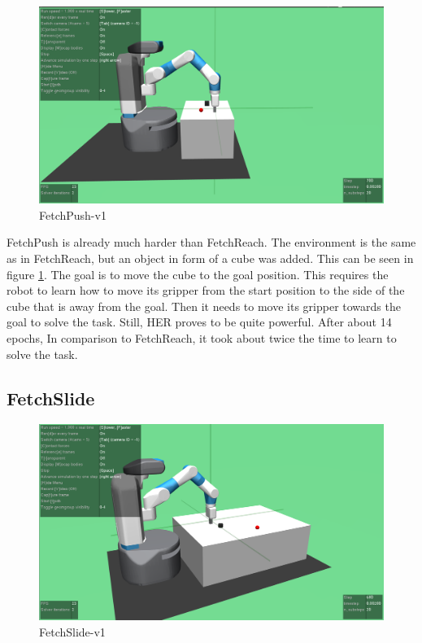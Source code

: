 \begin{figure} [h]
	
	\centering
	\includegraphics[width=1\textwidth]{figures/FetchPush-v1.png}
	\caption{FetchPush-v1}
	\label{push1}
\end{figure}

FetchPush is already much harder than FetchReach. The environment is the same as in FetchReach, but an object in form of a cube was added. This can be seen in figure \ref{push1}. The goal is to move the cube to the goal position. This requires the robot to learn how to move its gripper from the start position to the side of the cube that is away from the goal. Then it needs to move its gripper towards the goal to solve the task. Still, HER proves to be quite powerful. After about 14 epochs, In comparison to FetchReach, it took about twice the time to learn to solve the task.





\subsection{FetchSlide}

\begin{figure} [h]
	
	\centering
	\includegraphics[width=1\textwidth]{figures/FetchSlide-v1.png}
	\caption{FetchSlide-v1}
	\label{slide1}
\end{figure}

